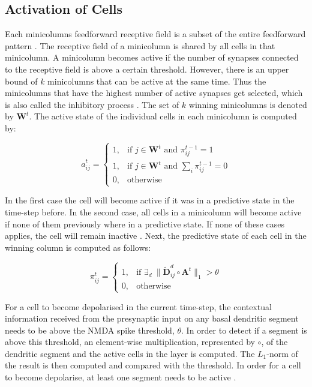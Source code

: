 \subsection{Activation of Cells}
Each minicolumns feedforward receptive field is a subset of the entire feedforward pattern \cite{10.3389/fncir.2016.00023}. The receptive field of a minicolumn is shared by all cells in that minicolumn. A minicolumn becomes active if the number of synapses connected to the receptive field is above a certain threshold. However, there is an upper bound of $k$ minicolumns that can be active at the same time. Thus the minicolumns that have the highest number of active synapses get selected, which is also called the inhibitory process \cite{10.3389/fncir.2016.00023}. The set of $k$ winning minicolumns is denoted by $\boldsymbol{W}^{t}$. The active state of the individual cells in each minicolumn is computed by:


\begin{equation}
    a_{ij}^{t} =
    \begin{cases}
      1,&\text{if } j \in \boldsymbol{W}^{t} \text{ and } \pi^{t-1}_{ij} = 1\\
      1,&\text{if } j \in \boldsymbol{W}^{t} \text{ and } \sum_i\pi^{t-1}_{ij} = 0\\
      0,&\text{otherwise}
    \end{cases}
\end{equation}


In the first case the cell will become active if it was in a predictive state in the time-step before. In the second case, all cells in a minicolumn will become active if none of them previously where in a predictive state. If none of these cases applies, the cell will remain inactive \cite{10.3389/fncir.2016.00023}. Next, the predictive state of each cell in the winning column is computed as follows:


\begin{equation}
    \pi^{t}_{ij} = 
        \begin{cases}
            1,&\text{if } \exists_d\ \Big\| \tilde{\boldsymbol{D}}^{d}_{ij} \circ \boldsymbol{A}^{t} \Big\|_1 > \theta\\
            0,&\text{otherwise}
        \end{cases}
\end{equation}


For a cell to become depolarised in the current time-step, the contextual information received from the presynaptic input on any basal dendritic segment needs to be above the NMDA spike threshold, $\theta$. In order to detect if a segment is above this threshold, an element-wise multiplication, represented by $\circ$, of the dendritic segment and the active cells in the layer is computed. The $L_1$-norm of the result is then computed and compared with the threshold. In order for a cell to become depolarise, at least one segment needs to be active \cite{10.3389/fncir.2016.00023}.
 

